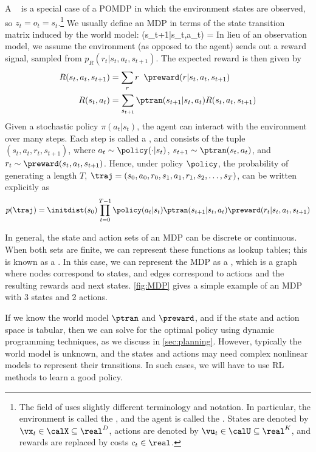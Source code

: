 A ~\citep{Puterman94}
is a special case of a POMDP in which the environment states are observed,
so $z_t=o_t=s_t$.\footnote{
%
The field of 
uses slightly different terminology and notation.
In particular, 
the environment is called the ,
and the agent is called the .
States are denoted by $\vx_t \in \calX \subseteq \real^D$,
actions are denoted by $\vu_t \in \calU \subseteq \real^K$,
and rewards are replaced by costs $c_t \in \real$.
}
We usually define an MDP in terms of the state transition matrix
induced by the world model:
\be
\ptran(s_{t+1}|s_t,a_t) = 
\ee
In lieu of an observation model, we assume the environment
(as opposed to the agent) sends out a reward signal,
sampled from $p_R(r_t|s_t,a_t,s_{t+1})$.
The expected reward is then given by
\begin{align}
  R(s_t,a_t,s_{t+1}) &= \sum_r r  \;\; \preward(r|s_t,a_t,s_{t+1}) \\
  R(s_t,a_t) &= \sum_{s_{t+1}} \ptran(s_{t+1}|s_t,a_t) R(s_t,a_t,s_{t+1})
\end{align}
Given a stochastic policy $\pi(a_t|s_t)$,
the agent can interact with the environment over many steps.
Each step is called a ,
and consists of the tuple $(s_t,a_t,r_t,s_{t+1})$,
where $a_t\sim \policy(\cdot|s_t)$,
$s_{t+1} \sim \ptran(s_t,a_t)$,
and $r_t \sim \preward(s_t,a_t,s_{t+1})$.
Hence, under policy $\policy$,
the probability of generating a   length $T$,
$\traj=(s_0,a_0,r_0,s_1,a_1,r_1,s_2,\ldots, s_T)$,
can be written explicitly as
\begin{align}
\label{eqn:rl-traj-prob}
p(\traj) = \initdist(s_0) \prod_{t=0}^{T-1} \policy(a_t|s_t) \ptran(s_{t+1}|s_t,a_t)
\preward(r_t|s_t,a_t,s_{t+1})
\end{align}


In general, the state and action sets of an MDP can be discrete or continuous.
When both sets are finite,
we can represent these functions as lookup tables;
this is known as a .
In this case, we can represent the MDP as a
,
which is a graph where nodes correspond to states,
and edges correspond to actions and the resulting rewards and next states.
\cref{fig:MDP} gives a simple example
of an MDP with 3 states and 2 actions.

If we know the world model $\ptran$ and $\preward$,
and if the state and action space is tabular,
then we can solve for the optimal policy
using dynamic programming techniques,
as we discuss in  \cref{sec:planning}.
However, typically the world model is unknown,
and the states and actions may need 
complex nonlinear models to represent their transitions.
In such cases, we will have to use RL methods to learn a good policy.






